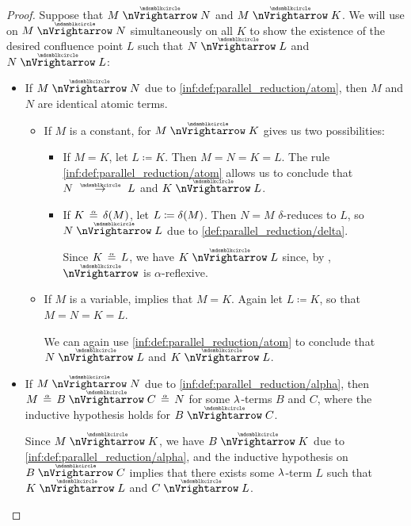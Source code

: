 \begin{proof}
   Suppose that \( M \ppred N \) and \( M \ppred K \). We will use  on \( M \ppred N \) simultaneously on all \( K \) to show the existence of the desired confluence point \( L \) such that \( N \ppred L \) and \( N \ppred L \):
  \begin{itemize}
    \item If \( M \ppred N \) due to \ref{inf:def:parallel_reduction/atom}, then \( M \) and \( N \) are identical atomic terms.

    \begin{itemize}
      \item If \( M \) is a constant,  for \( M \ppred K \) gives us two possibilities:
      \begin{itemize}
        \item If \( M = K \), let \( L \coloneqq K \). Then \( M = N = K = L \). The rule \ref{inf:def:parallel_reduction/atom} allows us to conclude that \( N \pred L \) and \( K \ppred L \).

        \item If \( K \aequiv \op*{\delta}(M) \), let \( L \coloneqq \op*{\delta}(M) \). Then \( N = M \) \( \delta \)-reduces to \( L \), so \( N \ppred L \) due to \ref{def:parallel_reduction/delta}.

       Since \( K \aequiv L \), we have \( K \ppred L \) since, by , \( {\ppred} \) is \( \alpha \)-reflexive.
      \end{itemize}

      \item If \( M \) is a variable,  implies that \( M = K \). Again let \( L \coloneqq K \), so that \( M = N = K = L \).

      We can again use \ref{inf:def:parallel_reduction/atom} to conclude that \( N \ppred L \) and \( K \ppred L \).
    \end{itemize}

    \item If \( M \ppred N \) due to \ref{inf:def:parallel_reduction/alpha}, then \( M \aequiv B \ppred C \aequiv N \) for some \( {\mathrm \lambda} \)-terms \( B \) and \( C \), where the inductive hypothesis holds for \( B \ppred C \).

    Since \( M \ppred K \), we have \( B \ppred K \) due to \ref{inf:def:parallel_reduction/alpha}, and the inductive hypothesis on \( B \ppred C \) implies that there exists some \( {\mathrm \lambda} \)-term \( L \) such that \( K \ppred L \) and \( C \ppred L \).


\end{itemize}
\end{proof}
